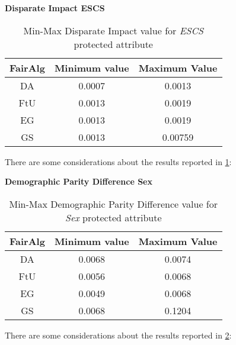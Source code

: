 \newpage
\textbf{Disparate Impact ESCS}
\begin{table}
    \centering
    \begin{tabular}{|c|c|c|}
        \hline
        \textbf{FairAlg} & \textbf{Minimum value} & \textbf{Maximum Value} \\
        \hline
        DA & 0.0007 & 0.0013 \\
        \hline
        FtU & 0.0013 & 0.0019 \\
        \hline
        EG & 0.0013 & 0.0019 \\
        \hline
        GS & 0.0013 & 0.00759 \\
        \hline
    \end{tabular}
    \caption{Min-Max Disparate Impact value for \emph{ESCS} protected attribute}
    \label{tab:e_di}
\end{table}

There are some considerations about the results reported in \cref{tab:e_di}:

\newpage
\textbf{Demographic Parity Difference Sex}
\begin{table}[H]
    \centering
    \begin{tabular}{|c|c|c|}
        \hline
        \textbf{FairAlg} & \textbf{Minimum value} & \textbf{Maximum Value} \\
        \hline
        DA & 0.0068 & 0.0074 \\
        \hline
        FtU & 0.0056 & 0.0068 \\
        \hline
        EG & 0.0049 & 0.0068 \\
        \hline
        GS & 0.0068 & 0.1204 \\
        \hline
    \end{tabular}
    \caption{Min-Max Demographic Parity Difference value for \emph{Sex} protected attribute}
    \label{tab:s_dpd}
\end{table}

There are some considerations about the results reported in \cref{tab:s_dpd}:

